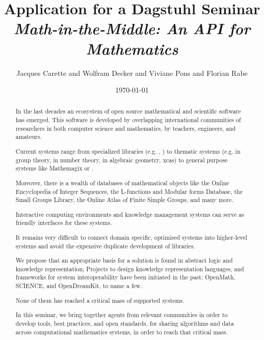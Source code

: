 \documentclass[a4paper,11pt]{article}
\title{Application for a Dagstuhl Seminar \\
  \emph{Math-in-the-Middle: An API for Mathematics}}
\author{Jacques Carette and Wolfram Decker and Viviane Pons and Florian Rabe}
\date{\today}
\begin{document}
\maketitle

\begin{abstract}
In the last decades an ecosystem of open source mathematical and scientific
software has emerged. This software is developed by overlapping international
communities of researchers in both computer science and mathematics, by
teachers, engineers, and amateurs.


Current systems range from specialized libraries (e.g. \MPIR, \Linbox) to
thematic systems (e.g. \GAP in group theory, \Pari in number theory, \Singular
in algebraic geometry, xcas) to general purpose systems
like Mathemagix or \Sage.

Moreover, there is a wealth of databases of mathematical objects like the
Online Encyclopedia of Integer Sequences, the L-functions and
Modular forms Database, the Small Groups Library, the Online Atlas of
Finite Simple Groups, and many more. 

Interactive computing environments \Jupyter and knowledge management systems
\MathHub can serve as friendly interfaces for these systems.

It remains very difficult to connect domain specific, optimised systems
into higher-level systems and avoid the expensive duplicate development
of libraries.

We propose that an appropriate basis for a solution is found in
abstract logic and knowledge representation; Projects to design
knowledge representation languages, and frameworks for system
interoperability have been initiated in the past: OpenMath, SCIENCE,
and OpenDreamKit, to name a few.

None of them has reached a critical mass of supported systems.

In this seminar, we bring together agents from relevant communities in order
to develop tools, best practices, and open standards, for sharing algorithms and
data across computational mathematics systems, in order to reach that critical mass.

\end{abstract}

\end{document}
